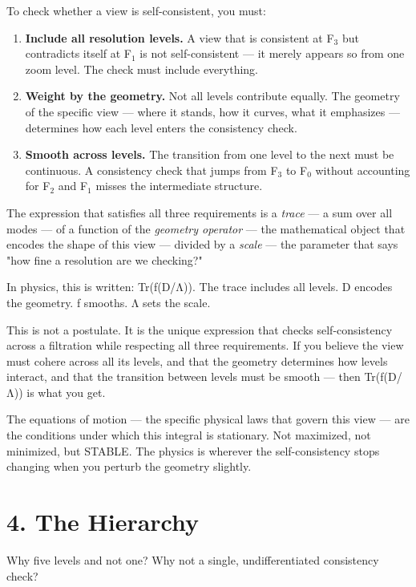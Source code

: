 To check whether a view is self-consistent, you must:


\begin{enumerate}[nosep,leftmargin=*]
  \item \textbf{Include all resolution levels.} A view that is consistent at F$_3$ but contradicts itself at F$_1$ is not self-consistent — it merely appears so from one zoom level. The check must include everything.
  \item \textbf{Weight by the geometry.} Not all levels contribute equally. The geometry of the specific view — where it stands, how it curves, what it emphasizes — determines how each level enters the consistency check.
  \item \textbf{Smooth across levels.} The transition from one level to the next must be continuous. A consistency check that jumps from F$_3$ to F$_0$ without accounting for F$_2$ and F$_1$ misses the intermediate structure.
\end{enumerate}


The expression that satisfies all three requirements is a \textit{trace} — a sum over all modes — of a function of the \textit{geometry operator} — the mathematical object that encodes the shape of this view — divided by a \textit{scale} — the parameter that says "how fine a resolution are we checking?"


In physics, this is written: Tr(f(D/Λ)). The trace includes all levels. D encodes the geometry. f smooths. Λ sets the scale.


This is not a postulate. It is the unique expression that checks self-consistency across a filtration while respecting all three requirements. If you believe the view must cohere across all its levels, and that the geometry determines how levels interact, and that the transition between levels must be smooth — then Tr(f(D/Λ)) is what you get.


The equations of motion — the specific physical laws that govern this view — are the conditions under which this integral is stationary. Not maximized, not minimized, but STABLE. The physics is wherever the self-consistency stops changing when you perturb the geometry slightly.


\section*{4. The Hierarchy}


Why five levels and not one? Why not a single, undifferentiated consistency check?


